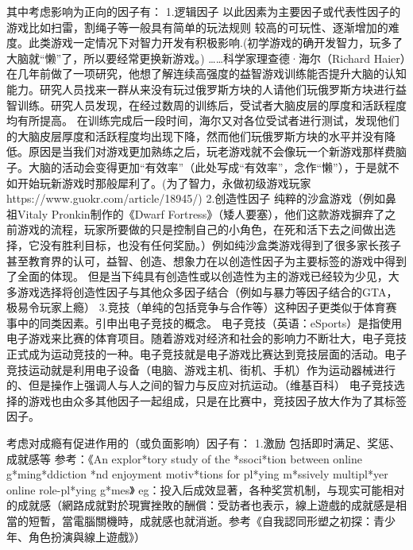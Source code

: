 其中考虑影响为正向的因子有：
1.逻辑因子 以此因素为主要因子或代表性因子的游戏比如扫雷，割绳子等一般具有简单的玩法规则
较高的可玩性、逐渐增加的难度。此类游戏一定情况下对智力开发有积极影响.(初学游戏的确开发智力，玩多了大脑就“懒”了，所以要经常更换新游戏。)
……科学家理查德·海尔（Richard Haier）在几年前做了一项研究，他想了解连续高强度的益智游戏训练能否提升大脑的认知能力。研究人员找来一群从来没有玩过俄罗斯方块的人请他们玩俄罗斯方块进行益智训练。研究人员发现，在经过数周的训练后，受试者大脑皮层的厚度和活跃程度均有所提高。
在训练完成后一段时间，海尔又对各位受试者进行测试，发现他们的大脑皮层厚度和活跃程度均出现下降，然而他们玩俄罗斯方块的水平并没有降低。原因是当我们对游戏更加熟练之后，玩老游戏就不会像玩一个新游戏那样费脑子。大脑的活动会变得更加“有效率”（此处写成“有效率”，念作“懒”），于是就不如开始玩新游戏时那般犀利了。(为了智力，永做初级游戏玩家https://www.guokr.com/article/18945/)
2.创造性因子 纯粹的沙盒游戏（例如鼻祖Vitaly Pronkin制作的《Dwarf Fortress》（矮人要塞），他们这款游戏摒弃了之前游戏的流程，玩家所要做的只是控制自己的小角色，在死和活下去之间做出选择，它没有胜利目标，也没有任何奖励。）例如纯沙盒类游戏得到了很多家长孩子甚至教育界的认可，益智、创造、想象力在以创造性因子为主要标签的游戏中得到了全面的体现。
但是当下纯具有创造性或以创造性为主的游戏已经较为少见，大多游戏选择将创造性因子与其他众多因子结合（例如与暴力等因子结合的GTA，极易令玩家上瘾）
3.竞技（单纯的包括竞争与合作等）这种因子更类似于体育赛事中的同类因素。引申出电子竞技的概念。
电子竞技（英语：eSports）是指使用电子游戏来比赛的体育项目。随着游戏对经济和社会的影响力不断壮大，电子竞技正式成为运动竞技的一种。电子竞技就是电子游戏比赛达到竞技层面的活动。电子竞技运动就是利用电子设备（电脑、游戏主机、街机、手机）作为运动器械进行的、但是操作上强调人与人之间的智力与反应对抗运动。（维基百科）
电子竞技选择的游戏也由众多其他因子一起组成，只是在比赛中，竞技因子放大作为了其标签因子。

考虑对成瘾有促进作用的（或负面影响）因子有：
1.激励
  包括即时满足、奖惩、成就感等
  参考：《An explor*tory study of the *ssoci*tion between online g*ming*ddiction *nd enjoyment motiv*tions for pl*ying m*ssively multipl*yer online role-pl*ying g*mes》
  eg：投入后成效显著，各种奖赏机制，与现实可能相对的成就感（網路成就對於現實挫敗的酬償：受訪者也表示，線上遊戲的成就感是相當的短暫，當電腦關機時，成就感也就消逝。参考《自我認同形塑之初探：青少年、角色扮演與線上遊戲》）


